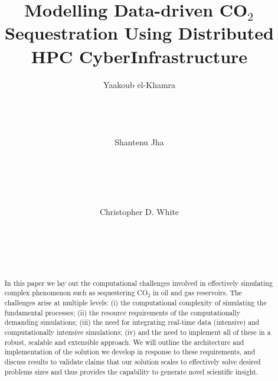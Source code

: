\documentclass{acm_proc_article-sp}
\begin{document}
\title{Modelling Data-driven CO$_{2}$ Sequestration Using Distributed HPC CyberInfrastructure}



\author{
\alignauthor
Yaakoub el-Khamra\\
       \\
       \\
       \\
       \\
\alignauthor
Shantenu Jha\\
       \\
       \\
       \\
       \\
       \\
\alignauthor
Christopher D. White\\
       \\
       \\
       \\
       \\
}

\maketitle

\begin{abstract} In this paper we lay out the
  computational challenges involved in effectively simulating complex
  phenomenon such as sequestering CO$_2$ in  oil and gas
  reservoirs. The challenges arise at multiple levels: (i) the
  computational complexity of simulating the fundamental processes;
  (ii) the resource requirements of the computationally demanding
  simulations; (iii) the need for integrating real-time data
  (intensive) and computationally intensive simulations; (iv) and the
  need to implement all of these in a robust, scalable and extensible
  approach. We will outline the architecture and implementation of the
  solution we develop in response to these requirements, and discuss
  results to validate claims that our solution scales to effectively
  solve desired problems sizes and thus provides the capability to
  generate novel scientific insight.\end{abstract}
\end{document}
